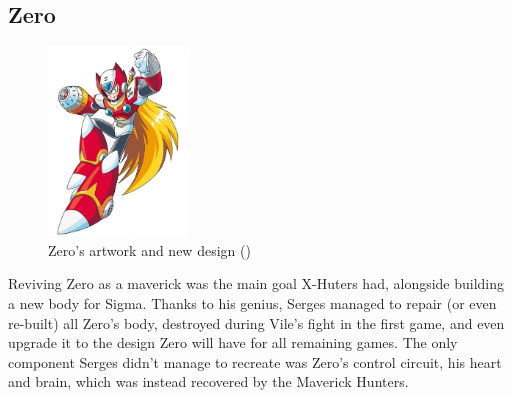 \subsection{Zero}\label{boss:Zero_X2}
\begin{figure}[htp]
	\centering
	\includegraphics[height=5cm]{figures/X2/Hunter_stages/Zero.png}
	\caption{Zero's artwork and new design (\cite{book:MMX_Complete_art})}
\end{figure}
Reviving Zero as a maverick was the main goal X-Huters had, alongside building a new body for Sigma. Thanks to his genius, Serges managed to repair (or even re-built) all Zero's body, destroyed during Vile's fight in the first game, and even upgrade it to the design Zero will have for all remaining games. The only component Serges didn't manage to recreate was Zero's control circuit, his heart and brain, which was instead recovered by the Maverick Hunters.
